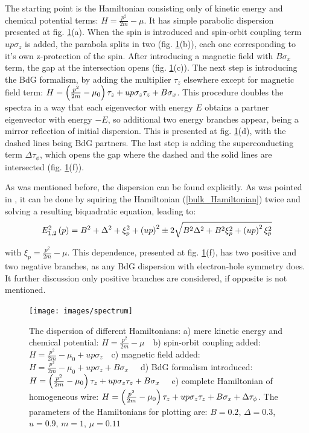 The starting point is the Hamiltonian consisting only of kinetic energy and chemical potential terms: $ H =\frac{ p^2}{2m} - \mu$. It has simple parabolic dispersion presented at fig. \ref{fig:spectrum}(a). When the spin is introduced and spin-orbit coupling term $ up\sigma_z $ is added, the parabola splits in two (fig. \ref{fig:spectrum}(b)), each one corresponding to it's own z-protection of the spin. After introducing a magnetic field with $ B\sigma_x $ term, the gap at the intersection opens (fig. \ref{fig:spectrum}(c)). The next step is introducing the BdG formalism, by adding the multiplier $ \tau_z $ elsewhere except for magnetic field term:  $ 	H = \left(\frac{p^2}{2m} 	-\mu_0 \right)\tau_z +u p \sigma_z \tau_z + B\sigma_x	 $. This procedure doubles the spectra in a way that each eigenvector with energy $ E $ obtains a partner eigenvector with energy $ -E $, so additional two energy branches appear, being a mirror reflection of  initial dispersion. This is presented at fig. \ref{fig:spectrum}(d), with the dashed lines being BdG partners. The last step is adding the superconducting term $ \Delta\tau_\phi $, which opens the gap where the dashed and the solid lines are intersected (fig. \ref{fig:spectrum}(f)).

As was mentioned before, the dispersion can be found explicitly. As was pointed in \cite{Oreg_2010}, it can be done by squiring the Hamiltonian (\ref{bulk_Hamiltonian}) twice and solving a resulting biquadratic equation, leading to:
\begin{equation}
E^2_{1,2}\left(p\right)
=
B^2
+
\Delta^2
+
\xi_p^2
+
\left(up\right)^2
\pm	
2\sqrt{
	B^2 \Delta^2
	+
	B^2\xi_p^2
	+
	\left(up\right)^2\xi_p^2
}
\end{equation}

with $ \xi_p =\frac{p^2}{2m}-\mu$. This dependence, presented at fig. \ref{fig:spectrum}(f), has two positive and two negative branches, as any BdG dispersion with electron-hole symmetry does. It further discussion only positive branches are considered, if opposite is not mentioned.

\begin{figure}[H]
	\centering
	\texttt{[image: images/spectrum]}
	\caption{The dispersion of different Hamiltonians:
		 a)  mere kinetic energy and chemical potential: $ H =\frac{ p^2}{2m} - \mu ~~~$
		 b) spin-orbit coupling added: $ 	H = \frac{p^2}{2m}-\mu_0 + u p \sigma_z ~~~$
		 c) magnetic field added: $ 	H = \frac{p^2}{2m} 	-\mu_0  +u p \sigma_z  + B\sigma_x ~~~~~$
		 d) BdG formalism introduced: $ 	H = \left(\frac{p^2}{2m} 	-\mu_0 \right)\tau_z +u p \sigma_z \tau_z + B\sigma_x	~~~ $
		 e) complete Hamiltonian of homogeneous wire: $ 	H = \left(\frac{p^2}{2m} 	-\mu_0 \right)\tau_z +u p \sigma_z \tau_z + B\sigma_x	+ \Delta\tau_\phi $.
		 The parameters of the Hamiltonians for plotting are: $ B=0.2 $, $ \Delta=0.3 $, $ u=0.9 $, $ m = 1 $, $ \mu = 0.11 $ 
 }
	\label{fig:spectrum}
\end{figure}

